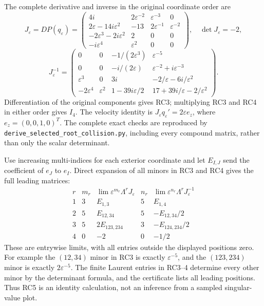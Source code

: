 The complete derivative and inverse in the original coordinate order
are
\[
 J_\varepsilon=DP(q_\varepsilon)=
 \begin{pmatrix}
 4i&2\varepsilon^{-2}&\varepsilon^{-3}&0\\
 2\varepsilon-14i\varepsilon^2&-13&2\varepsilon^{-1}&\varepsilon^{-2}\\
 -2\varepsilon^3-2i\varepsilon^2&2&0&0\\
 -i\varepsilon^4&\varepsilon^2&0&0
 \end{pmatrix},\quad\det J_\varepsilon=-2, \tag{RC3}
\]
\[
 J_\varepsilon^{-1}=
 \begin{pmatrix}
 0&0&-1/(2\varepsilon^3)&\varepsilon^{-5}\\
 0&0&-i/(2\varepsilon)&\varepsilon^{-2}+i\varepsilon^{-3}\\
 \varepsilon^3&0&3i&-2/\varepsilon-6i/\varepsilon^2\\
 -2\varepsilon^4&\varepsilon^2&1-39i\varepsilon/2&
                  17+39i/\varepsilon-2/\varepsilon^2
 \end{pmatrix}. \tag{RC4}
\]
Differentiation of the original components gives RC3; multiplying
RC3 and RC4 in either order gives $I_4$. The velocity identity is
$J_\varepsilon q_\varepsilon'=2\varepsilon e_z$, where
$e_z=(0,0,1,0)^T$. The complete exact checks are reproduced by
\texttt{derive\_selected\_root\_collision.py}, including every
compound matrix, rather than only the scalar determinant.

Use increasing multi-indices for each exterior coordinate and let
$E_{I,J}$ send the coefficient of $e_J$ to $e_I$. Direct expansion
of all minors in RC3 and RC4 gives the full leading matrices:
\[
 \begin{array}{c|c|c|c|c}
 r& m_r&\lim\varepsilon^{m_r}\Lambda^rJ_\varepsilon&
        n_r&\lim\varepsilon^{n_r}\Lambda^rJ_\varepsilon^{-1}\\\hline
 1&3&E_{1,3}&5&E_{1,4}\\
 2&5&E_{12,34}&5&-E_{12,34}/2\\
 3&5&2E_{123,234}&3&-E_{124,234}/2\\
 4&0&-2&0&-1/2
 \end{array} \tag{RC5}
\]
These are entrywise limits, with all entries outside the displayed
positions zero. For example the $(12,34)$ minor in RC3 is exactly
$\varepsilon^{-5}$, and the $(123,234)$ minor is exactly
$2\varepsilon^{-5}$. The finite Laurent entries in RC3--4 determine
every other minor by the determinant formula, and the certificate
lists all leading positions. Thus RC5 is an identity calculation,
not an inference from a sampled singular-value plot.

